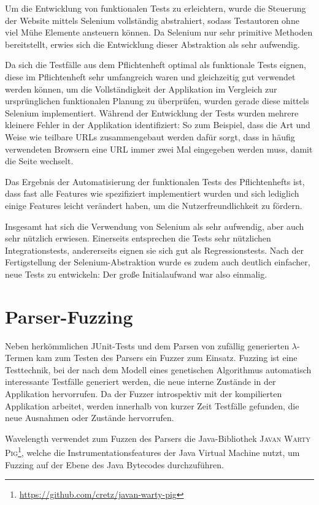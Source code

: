 \documentclass[parskip=full,11pt,openany]{scrreprt}
\begin{document}
Um die Entwicklung von funktionalen Tests zu erleichtern, wurde die Steuerung der Website mittels Selenium vollständig abstrahiert, sodass Testautoren ohne viel Mühe Elemente ansteuern können.
Da Selenium nur sehr primitive Methoden bereitstellt, erwies sich die Entwicklung dieser Abstraktion als sehr aufwendig. 

Da sich die Testfälle aus dem Pflichtenheft optimal als funktionale Tests eignen, diese im Pflichtenheft sehr umfangreich waren und gleichzeitig gut verwendet werden können, um die Vollständigkeit der Applikation im Vergleich zur ursprünglichen funktionalen Planung zu überprüfen, wurden gerade diese mittels Selenium implementiert. Während der Entwicklung der Tests wurden mehrere kleinere Fehler in der Applikation identifiziert: So zum Beispiel, dass die Art und Weise wie teilbare URLs zusammengebaut werden dafür sorgt, dass in häufig verwendeten Browsern eine URL immer zwei Mal eingegeben werden muss, damit die Seite wechselt.

Das Ergebnis der Automatisierung der funktionalen Tests des Pflichtenhefts ist, dass fast alle Features wie spezifiziert implementiert wurden und sich lediglich einige Features leicht verändert haben, um die Nutzerfreundlichkeit zu fördern.

Insgesamt hat sich die Verwendung von Selenium als sehr aufwendig, aber auch sehr nützlich erwiesen. Einerseits entsprechen die Tests sehr nützlichen Integrationstests, andererseits eignen sie sich gut als Regressionstests. Nach der Fertigstellung der Selenium-Abstraktion wurde es zudem auch deutlich einfacher, neue Tests zu entwickeln: Der große Initialaufwand war also einmalig.



\section{Parser-Fuzzing}
Neben herkömmlichen JUnit-Tests und dem Parsen von zufällig generierten
$\lambda$-Termen kam zum Testen des Parsers ein Fuzzer zum Einsatz. Fuzzing ist
eine Testtechnik, bei der nach dem Modell eines genetischen Algorithmus
automatisch interessante Testfälle generiert werden, die neue interne Zustände
in der Applikation hervorrufen. Da der Fuzzer introspektiv mit der kompilierten
Applikation arbeitet, werden innerhalb von kurzer Zeit Testfälle gefunden, die
neue Ausnahmen oder Zustände hervorrufen.

Wavelength verwendet zum Fuzzen des Parsers die Java-Bibliothek
\textsc{Javan Warty Pig\footnote{\url{https://github.com/cretz/javan-warty-pig}}},
welche die Instrumentationsfeatures der Java Virtual Machine nutzt, um Fuzzing
auf der Ebene des Java Bytecodes durchzuführen.
\end{document}
